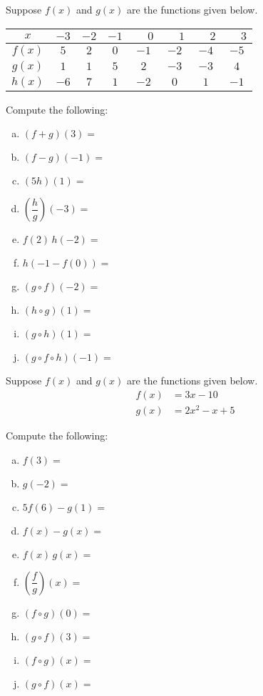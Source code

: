 \documentclass[11pt,letterpaper]{article}
\begin{document}
\newpage





\prob Suppose $f(x)$ and $g(x)$ are the functions given below. 
        \begin{table}[H]
        \centering
        \begin{tabular}{| c || c | c | c | c | c | c | c |} \hline
	$x$ & $-3$ & $-2$ & $-1$ & $\phantom{-}0$ & $\phantom{-}1$ & $\phantom{-}2$ & $\phantom{-}3$ \\ \hline
	$f(x)$ & $5$ & $2$ & $0$ & $-1$ & $-2$ & $-4$ & $-5$ \\ \hline
	$g(x)$ & $1$ & $1$ & $5$ & $2$ & $-3$ & $-3$ & $4$ \\ \hline
	$h(x)$ & $-6$ & $7$ & $1$ & $-2$ & $0$ & $1$ & $-1$ \\ \hline
        \end{tabular}
        \end{table}

Compute the following: \pspace
        \begin{enumerate}[(a)]
        \item $(f + g)(3)=$ 
        \item $(f - g)(-1)=$ 
        \item $(5h)(1)=$ 
        \item $\left(\dfrac{h}{g}\right)(-3)=$ 
        \item $f(2)\, h(-2)=$ 
        \item $h(-1 - f(0))=$ 
        \item $(g \circ f)(-2)=$ 
	\item $(h \circ g)(1)=$ 
        \item $(g \circ h)(1)=$ 
	\item $(g \circ f \circ h)(-1)=$ 
        \end{enumerate} \pspace


\prob Suppose $f(x)$ and $g(x)$ are the functions given below. 
	\[
	\begin{aligned}
	f(x)&= 3x - 10 \\[0.3cm]
	g(x)&= 2x^2 - x + 5
	\end{aligned}
	\]

Compute the following: \pspace
\begin{enumerate}[(a)]
\item $f(3)=$ 
\item $g(-2)=$ 
\item $5f(6) - g(1)=$ 
\item $f(x) - g(x)=$ 
\item $f(x) \, g(x)=$ 
\item $\left( \dfrac{f}{g} \right)(x)=$ 
\item $(f \circ g)(0)=$ 
\item $(g \circ f)(3)=$ 
\item $(f \circ g)(x)=$ 
\item $(g \circ f)(x)=$ 
\end{enumerate} \pspace
\end{document}
